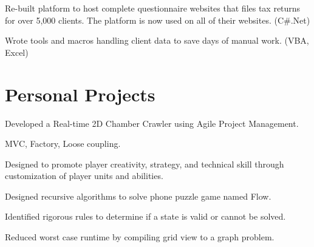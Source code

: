\documentclass[letterpaper]{kevin-resume} %
\begin{document}
\begin{minipage}[t]{0.66\textwidth}
\sectionspace %


\begin{tightitemize}
	\item Re-built platform to host complete questionnaire websites that files tax returns for over 5,000 clients. The platform is now used on all of their websites. (C\#.Net)
	\item Wrote tools and macros handling client data to save days of manual work. (VBA, Excel)
\end{tightitemize}

\sectionspace %


\section{Personal Projects}

\begin{tightitemize}
	\item Developed a Real-time 2D Chamber Crawler using Agile Project Management.
	\item MVC, Factory, Loose coupling.
	\item Designed to promote player creativity, strategy, and technical skill through customization of player units and abilities.
\end{tightitemize}

\sectionspace %


\begin{tightitemize}
	\item Designed recursive algorithms to solve phone puzzle game named Flow.
 	\item Identified rigorous rules to determine if a state is valid or cannot be solved.
 	\item Reduced worst case runtime by compiling grid view to a graph problem. 
\end{tightitemize}

\sectionspace %


\end{minipage}
\end{document}
